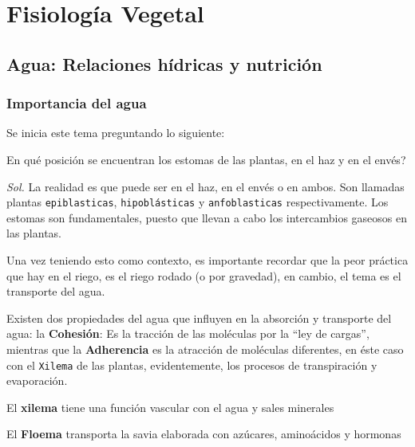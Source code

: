 \chapter{Fisiología Vegetal}

\section{Agua: Relaciones hídricas y nutrición}

\subsection{Importancia del agua}

Se inicia este tema preguntando lo siguiente: 

\begin{remark}
    En qué posición se encuentran los estomas de las plantas, en el haz y en el envés?
\end{remark}

\textit{ Sol. } La realidad es que puede ser en el haz, en el envés o en ambos.
Son llamadas plantas \texttt{epiblasticas}, \texttt{hipoblásticas} y \texttt{anfoblasticas} respectivamente.
Los estomas son fundamentales, puesto que llevan a cabo los intercambios gaseosos en las plantas.

Una vez teniendo esto como contexto, es importante recordar que la peor práctica que hay en el riego, es el riego rodado (o por gravedad),
en cambio, el tema es el transporte del agua.

Existen dos propiedades del agua que influyen en la absorción y transporte del agua: la \textbf{Cohesión}: 
Es la tracción de las moléculas por la ``ley de cargas'', mientras que la \textbf{Adherencia} es la atracción de moléculas diferentes, en éste caso con el \texttt{Xilema} de las plantas,
evidentemente, los procesos de transpiración y evaporación. 
\begin{remark}
    El \textbf{xilema} tiene una función vascular con el agua y sales minerales
\end{remark}
\begin{remark}
    El \textbf{Floema} transporta la savia elaborada con azúcares, aminoácidos y hormonas
\end{remark}

